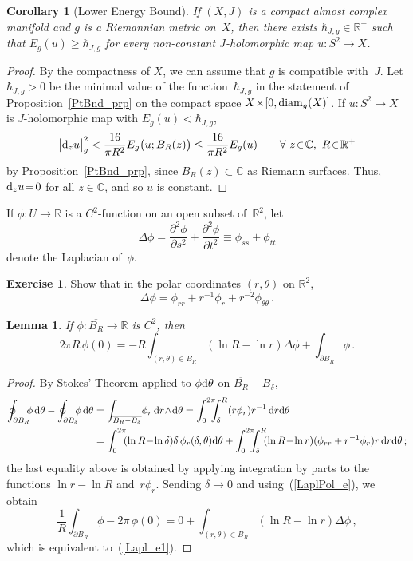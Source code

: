 \documentclass[11pt]{article}
\numberwithin{equation}{section}
\newtheorem{lmm}[thm]{Lemma}
\newtheorem{crl}[thm]{Corollary}
\theoremstyle{definition}
\newtheorem{exer}[thm]{Exercise}
\def\BE#1{\begin{equation}\label{#1}}
\def\EE{\end{equation}}
\def\eref#1{(\ref{#1})}
\def\ov#1{\overline{#1}}
\def\lra{\longrightarrow}
\def\C{\mathbb{C}}
\def\R{\mathbb R}
\def\de{\delta}
\def\th{\theta}
\def\De{\Delta}
\def\prt{\partial}
\def\w{\wedge}
\def\diam{\textnormal{diam}}
\def\nd{\textnormal{d}}
\begin{document}
\begin{crl}[Lower Energy Bound]\label{LowEner_crl}
If $(X,J)$ is a compact almost complex manifold and $g$ is a Riemannian metric on~$X$, 
then there exists $\hbar_{J,g}\!\in\!\R^+$ such that 
$E_g(u)\!\ge\!\hbar_{J,g}$ for every non-constant $J$-holomorphic map
$u\!:S^2\!\lra\!X$.
\end{crl}

\begin{proof}
By the compactness of $X$, we can assume that $g$ is compatible with~$J$.
Let $\hbar_{J,g}\!>\!0$ be the minimal value of the function~$\hbar_{J,g}$
in the statement of Proposition~\ref{PtBnd_prp} on the compact space 
$X\!\times\![0,\diam_g(X)]$.
If $u\!:S^2\!\lra\!X$ is $J$-holomorphic map with $E_g(u)\!<\!\hbar_{J,g}$,
$$\big|\nd_zu\big|_g^2<\frac{16}{\pi R^2} E_g\big(u;B_R(z)\big)
\le \frac{16}{\pi R^2}E_g(u)\qquad\forall~z\!\in\!\C,~R\!\in\!\R^+$$
by Proposition~\ref{PtBnd_prp}, since $B_R(z)\!\subset\!\C$ as Riemann surfaces.
Thus, $\nd_zu\!=\!0$ for all $z\!\in\!\C$, and so $u$ is constant.
\end{proof}


\noindent
If $\phi\!:U\!\lra\!\R$ is a $C^2$-function on an open subset of~$\R^2$, let
$$\De\phi=\frac{\prt^2\phi}{\prt s^2}+\frac{\prt^2\phi}{\prt t^2}
\equiv \phi_{ss}+\phi_{tt}$$
denote the Laplacian of~$\phi$.

\begin{exer}\label{LaplPol_exer}
Show that in the polar coordinates $(r,\th)$ on $\R^2$,
\BE{LaplPol_e}\De\phi=\phi_{rr}+r^{-1}\phi_r+r^{-2}\phi_{\th\th}\,.\EE
\end{exer}

\begin{lmm}\label{Lapl_lmm1}
If $\phi\!:\ov{B_R}\!\lra\!\R$ is $C^2$, then
\BE{Lapl_e1}
2\pi R\,\phi(0)=-R\int_{(r,\th)\in B_R}\!\!(\ln R\!-\!\ln r)\De\phi
+\int_{\prt B_R}\phi\,.\EE 
\end{lmm}

\begin{proof} By Stokes' Theorem applied to $\phi\nd\th$ on $\ov{B_R}\!-\!B_{\de}$,
\begin{equation*}\begin{split}
\oint_{\prt B_R}\!\!\!\phi\,\nd\th-\oint_{\prt B_{\de}}\!\!\!\phi\,\nd\th
&=\int_{\ov{B_R-B_{\de}}}\!\phi_r\,\nd r\!\w\!\nd\th
=\int_0^{2\pi}\!\!\!\!\int_{\de}^R(r\phi_r)r^{-1}\,\nd r\nd\th\\
&=\int_0^{2\pi}\!\!(\ln R\!-\!\ln\de)\de\,\phi_r(\de,\th)\nd\th
+\int_0^{2\pi}\!\!\!\!\int_{\de}^R\!\!(\ln R\!-\!\ln r)(\phi_{rr}+r^{-1}\phi_r)r\,\nd r\nd\th\,;
\end{split}\end{equation*}
the last equality above is obtained by applying integration by parts to the functions
$\ln r\!-\!\ln R$ and~$r\phi_r$.
Sending $\de\!\lra\!0$ and using~\eref{LaplPol_e}, we obtain
$$\frac1R\int_{\prt B_R}\phi - 2\pi\,\phi(0)=0+ 
\int_{(r,\th)\in B_R}\!\!(\ln R\!-\!\ln r)\De\phi\,,$$
which is equivalent to~\eref{Lapl_e1}.
\end{proof}
\end{document}

